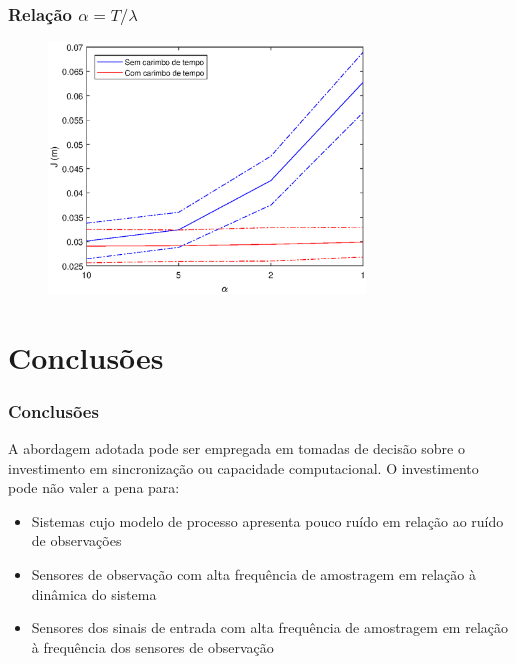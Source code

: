 \documentclass{beamer}
\begin{document}
\begin{frame}
	\frametitle{Relação $\alpha = T/\lambda$}
	
	\begin{figure}
		\centering
		\includegraphics[width=0.75\textwidth]{images/dtudty.eps}
	\end{figure}

\end{frame}



\section{Conclusões} 

\begin{frame}
	\frametitle{Conclusões}
	A abordagem adotada pode ser empregada em tomadas de decisão sobre o investimento em sincronização ou capacidade computacional. O investimento pode não valer a pena para:
	
	\begin{itemize}
		\item Sistemas cujo modelo de processo apresenta pouco ruído em relação ao ruído de observações 
		\item Sensores de observação com alta frequência de amostragem em relação à dinâmica do sistema
		\item Sensores dos sinais de entrada com alta frequência de amostragem em relação à frequência dos sensores de observação
	\end{itemize}

\end{frame}
\end{document}
